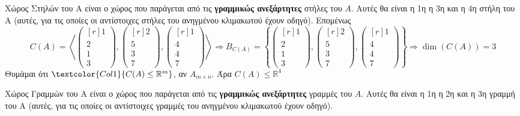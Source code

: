 \begin{myitemize}[leftmargin=*]
  \item \textcolor{Col1}{Χώρος Στηλών} του Α είναι ο χώρος που παράγεται 
    από τις \textbf{γραμμικώς ανεξάρτητες} \textcolor{Col1}{στήλες} του $A$. 
    Αυτές θα είναι η 1η η 3η και η 4η στήλη \textcolor{Col1}{του Α} 
    (αυτές, για τις οποίες οι αντίστοιχες στήλες του ανηγμένου κλιμακωτού έχουν οδηγό).
    Επομένως 
    \[
      C(A) = \left< 
      \begin{pmatrix*}[r] 1 \\ 2 \\ 1 \\ 3 \end{pmatrix*} , 
      \begin{pmatrix*}[r] 2 \\ 5 \\ 3 \\ 7 \end{pmatrix*} , 
      \begin{pmatrix*}[r] 1 \\ 4 \\ 4 \\ 7 \end{pmatrix*} \right> \Rightarrow 
      B_{C(A)} = \left\{  
        \begin{pmatrix*}[r] 1 \\ 2 \\ 1 \\ 3 \end{pmatrix*} , 
        \begin{pmatrix*}[r] 2 \\ 5 \\ 3 \\ 7 \end{pmatrix*} , 
      \begin{pmatrix*}[r] 1 \\ 4 \\ 4 \\ 7 \end{pmatrix*} \right\} \Rightarrow 
      \dim(C(A)) = 3
    \] 
    Θυμάμαι ότι $ \textcolor{Col1}{C(A) \leq \mathbb{R}^{m}} $, αν 
    $ A_{m\times n} $. Άρα $ C(A) \leq \mathbb{R}^{4} $
  \item \textcolor{Col1}{Χώρος Γραμμών} του Α είναι ο χώρος που παράγεται 
    από τις \textbf{γραμμικώς ανεξάρτητες} \textcolor{Col1}{γραμμές} του $A$. 
    Αυτές θα είναι η 1η η 2η και η 3η γραμμή \textcolor{Col1}{του Α} 
    (αυτές, για τις οποίες οι αντίστοιχες γραμμές του ανηγμένου κλιμακωτού έχουν οδηγό).

\end{myitemize}
